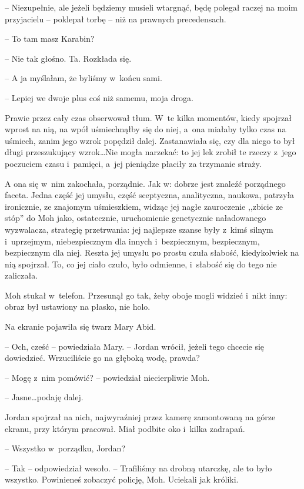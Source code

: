 \documentclass[oneside,polish,11pt,sfheadings]{mwbk}
\begin{document}
-- Niezupełnie, ale jeżeli będziemy musieli wtargnąć, będę polegał raczej
na moim przyjacielu -- poklepał torbę -- niż na prawnych precedensach.

-- To tam masz Karabin?

-- Nie tak głośno. Ta. Rozkłada się.

-- A ja myślałam, że byliśmy w~końcu sami.

-- Lepiej we dwoje plus coś niż samemu, moja droga.

Prawie przez cały czas obserwował tłum. W~te kilka momentów, kiedy
spojrzał wprost na nią, na wpół uśmiechnąłby się do niej, a~ona miałaby tylko
czas na uśmiech, zanim jego wzrok popędził dalej. Zastanawiała się, czy
dla niego to był długi przeszukujący wzrok\ldots Nie mogła narzekać: to jej
lek zrobił te rzeczy z~jego poczuciem czasu i~pamięci, a~jej pieniądze
płaciły za trzymanie straży.

A ona się w~nim zakochała, porządnie. Jak w: dobrze jest znaleźć
porządnego faceta. Jedna część jej umysłu, część sceptyczna,
analityczna, naukowa, patrzyła ironicznie, ze znajomym uśmieszkiem,
widząc jej nagłe zauroczenie ,,zbicie ze stóp'' do Moh jako, ostatecznie,
uruchomienie genetycznie naładowanego wyzwalacza, strategię przetrwania:
jej najlepsze szanse były z~kimś silnym i~uprzejmym, niebezpiecznym dla
innych i~bezpiecznym, bezpiecznym, bezpiecznym dla niej. Reszta jej
umysłu po prostu czuła słabość, kiedykolwiek na nią spojrzał. To, co jej
ciało czuło, było odmienne, i~słabość się do tego nie zaliczała.

Moh stukał w~telefon. Przesunął go tak, żeby oboje mogli widzieć i~nikt
inny: obraz był ustawiony na płasko, nie holo.

Na ekranie pojawiła się twarz Mary Abid.

-- Och, cześć -- powiedziała Mary. -- Jordan wrócił, jeżeli tego chcecie
się dowiedzieć. Wrzuciliście go na głęboką wodę, prawda?

-- Mogę z~nim pomówić? -- powiedział niecierpliwie Moh.

-- Jasne\ldots podaję dalej.

Jordan spojrzał na nich, najwyraźniej przez kamerę zamontowaną na górze
ekranu, przy którym pracował. Miał podbite oko i~kilka zadrapań.

-- Wszystko w~porządku, Jordan?

-- Tak -- odpowiedział wesoło. -- Trafiliśmy na drobną utarczkę, ale to było
wszystko. Powinieneś zobaczyć policję, Moh. Uciekali jak króliki.
\end{document}
